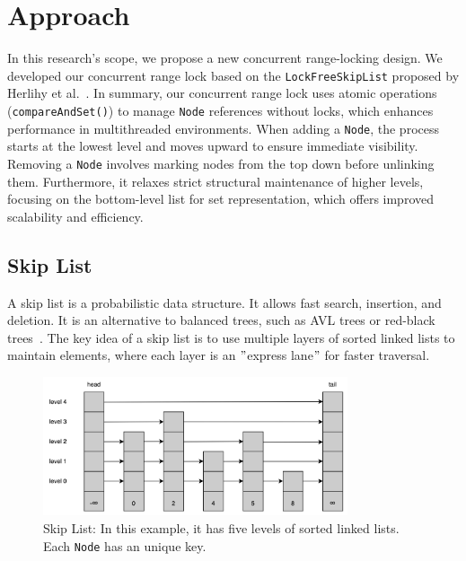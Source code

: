 \chapter{Approach}\label{ch:approach}

In this research's scope, we propose a new concurrent range-locking design.
We developed our concurrent range lock based on the \texttt{LockFreeSkipList} proposed by Herlihy et al.~\parencite{herlihy2020art}.
In summary, our concurrent range lock uses atomic operations (\texttt{compareAndSet()}) to manage \texttt{Node} references without locks, which enhances performance in multithreaded environments.
When adding a \texttt{Node}, the process starts at the lowest level and moves upward to ensure immediate visibility.
Removing a \texttt{Node} involves marking nodes from the top down before unlinking them.
Furthermore, it relaxes strict structural maintenance of higher levels, focusing on the bottom-level list for set representation, which offers improved scalability and efficiency.

\section{Skip List}\label{sec:skip-list}

A skip list is a probabilistic data structure.
It allows fast search, insertion, and deletion.
It is an alternative to balanced trees, such as AVL trees or red-black trees~\parencite{pugh1990skip, pugh1990skip2}.
The key idea of a skip list is to use multiple layers of sorted linked lists to maintain elements, where each layer is an \("\)express lane\("\) for faster traversal.

\begin{figure}[h]
    \centering
    \includegraphics[width=0.8\textwidth]{./figures/skiplist.png}
    \caption{Skip List: In this example, it has five levels of sorted linked lists. \\
 Each \texttt{Node} has an unique key.}
    \label{fig:skiplist}
\end{figure}

